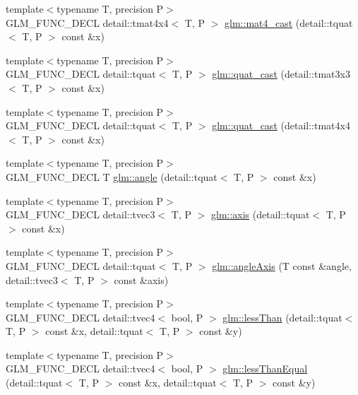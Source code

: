 \begin{CompactItemize}
\item 
{\footnotesize template$<$typename T, precision P$>$ }\\GLM\_\-FUNC\_\-DECL detail::tmat4x4$<$ T, P $>$ \hyperlink{group__gtc__quaternion_gbe87795cddd91732acb07830f8125a2d}{glm::mat4\_\-cast} (detail::tquat$<$ T, P $>$ const \&x)
\item 
{\footnotesize template$<$typename T, precision P$>$ }\\GLM\_\-FUNC\_\-DECL detail::tquat$<$ T, P $>$ \hyperlink{group__gtc__quaternion_ga615768cdd09816fd42da38f484fb4c0}{glm::quat\_\-cast} (detail::tmat3x3$<$ T, P $>$ const \&x)
\item 
{\footnotesize template$<$typename T, precision P$>$ }\\GLM\_\-FUNC\_\-DECL detail::tquat$<$ T, P $>$ \hyperlink{group__gtc__quaternion_ge2011ef54746786bc5a93314dfcf54b5}{glm::quat\_\-cast} (detail::tmat4x4$<$ T, P $>$ const \&x)
\item 
{\footnotesize template$<$typename T, precision P$>$ }\\GLM\_\-FUNC\_\-DECL T \hyperlink{group__gtc__quaternion_g48c100d72c9c3295b75c9133ddbb83d1}{glm::angle} (detail::tquat$<$ T, P $>$ const \&x)
\item 
{\footnotesize template$<$typename T, precision P$>$ }\\GLM\_\-FUNC\_\-DECL detail::tvec3$<$ T, P $>$ \hyperlink{group__gtc__quaternion_g5c243b588291c790bf1b5ec3f0f08d1b}{glm::axis} (detail::tquat$<$ T, P $>$ const \&x)
\item 
{\footnotesize template$<$typename T, precision P$>$ }\\GLM\_\-FUNC\_\-DECL detail::tquat$<$ T, P $>$ \hyperlink{group__gtc__quaternion_g96dbce7a48d76fa63e65c4ba949a3bc4}{glm::angleAxis} (T const \&angle, detail::tvec3$<$ T, P $>$ const \&axis)
\item 
{\footnotesize template$<$typename T, precision P$>$ }\\GLM\_\-FUNC\_\-DECL detail::tvec4$<$ bool, P $>$ \hyperlink{group__gtc__quaternion_gf0ab4cfbc0f3e16f060fa4dd501b5dc1}{glm::lessThan} (detail::tquat$<$ T, P $>$ const \&x, detail::tquat$<$ T, P $>$ const \&y)
\item 
{\footnotesize template$<$typename T, precision P$>$ }\\GLM\_\-FUNC\_\-DECL detail::tvec4$<$ bool, P $>$ \hyperlink{group__gtc__quaternion_g43f2f8f0e9b252966c72f357fc834184}{glm::lessThanEqual} (detail::tquat$<$ T, P $>$ const \&x, detail::tquat$<$ T, P $>$ const \&y)
\item 

\end{CompactItemize}
